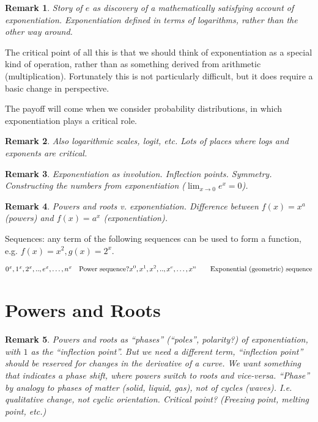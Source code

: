 \documentclass[reqno,12pt]{tufte-book}
\numberwithin{equation}{subsection}
\newtheorem{remark}{Remark}
\begin{document}
\begin{remark}
  Story of $e$ as discovery of a mathematically satisfying account of
  exponentiation.  Exponentiation defined in terms of logarithms,
  rather than the other way around.
\end{remark}

The critical point of all this is that we should think of
exponentiation as a special kind of operation, rather than as
something derived from arithmetic (multiplication).  Fortunately this
is not particularly difficult, but it does require a basic change in
perspective.

The payoff will come when we consider probability distributions, in
which exponentiation plays a critical role.

\begin{remark}
  Also logarithmic scales, logit, etc.  Lots of places where logs and
  exponents are critical.
\end{remark}

\begin{remark}
  Exponentiation as involution.  Inflection points.  Symmetry.
  Constructing the numbers from exponentiation ($\lim_{x \to 0}e^x =
  0$).
\end{remark}

\begin{remark}
  Powers and roots v. exponentiation.  Difference between ${f(x) =
    x^a}$ (powers) and ${f(x)= a^x}$ (exponentiation).
\end{remark}

Sequences: any term of the following sequences can be used to form a
function, e.g. $f(x) = x^2, g(x) = 2^x$.

{
  \begin{alignat}{2}
    0^x, 1^x, 2^x,..,e^x,\ldots,n^x & \quad \textnormal{Power sequence?}
    x^0, x^1, x^2,..,x^e,\ldots,x^n & \quad \textnormal{Exponential (geometric) sequence} \\
  \end{alignat}
}

\section{Powers and Roots}

\begin{remark}
  Powers and roots as ``phases'' (``poles'', polarity?) of
  exponentiation, with $1$ as the ``inflection point''.  But we need a
  different term, ``inflection point'' should be reserved for changes
  in the derivative of a curve.  We want something that indicates a
  phase shift, where powers switch to roots and vice-versa.  ``Phase''
  by analogy to phases of matter (solid, liquid, gas), not of cycles
  (waves).  I.e. qualitative change, not cyclic orientation.  Critical
  point? (Freezing point, melting point, etc.)
\end{remark}
\end{document}
